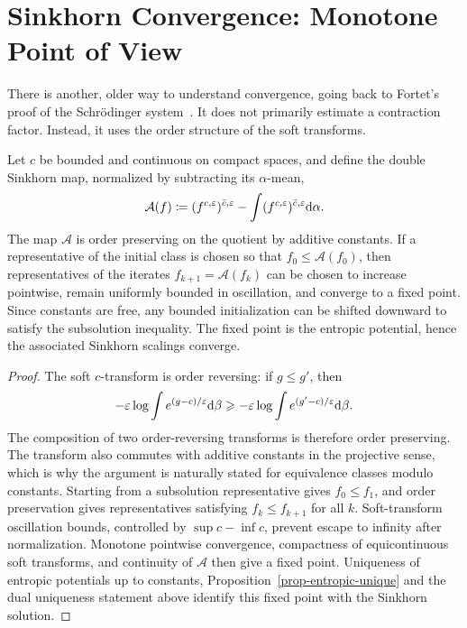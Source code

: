 \section{Sinkhorn Convergence: Monotone Point of View}

There is another, older way to understand convergence, going back to Fortet's proof of the Schr\"odinger system~\cite{fortet1940schrodinger,essid2019fortet,leonard2019fortet}. It does not primarily estimate a contraction factor. Instead, it uses the order structure of the soft transforms.

\begin{prop}\label{prop-fortet-monotone}
	Let $c$ be bounded and continuous on compact spaces, and define the double Sinkhorn map, normalized by subtracting its $\alpha$-mean,
	\[
		\mathcal A(f) \coloneqq
		(f^{c,\varepsilon})^{\bar c,\varepsilon}
		-\int (f^{c,\varepsilon})^{\bar c,\varepsilon}\mathrm{d}\alpha.
	\]
	The map $\mathcal A$ is order preserving on the quotient by additive constants. If a representative of the initial class is chosen so that $f_0\leq \mathcal A(f_0)$, then representatives of the iterates $f_{k+1}=\mathcal A(f_k)$ can be chosen to increase pointwise, remain uniformly bounded in oscillation, and converge to a fixed point. Since constants are free, any bounded initialization can be shifted downward to satisfy the subsolution inequality. The fixed point is the entropic potential, hence the associated Sinkhorn scalings converge.
\end{prop}

\begin{proof}
	The soft $c$-transform is order reversing: if $g\leq g'$, then
	\[
		-\varepsilon\log\int e^{(g-c)/\varepsilon}\mathrm{d}\beta
		\geqslant
		-\varepsilon\log\int e^{(g'-c)/\varepsilon}\mathrm{d}\beta.
	\]
	The composition of two order-reversing transforms is therefore order preserving. The transform also commutes with additive constants in the projective sense, which is why the argument is naturally stated for equivalence classes modulo constants. Starting from a subsolution representative gives $f_0\leq f_1$, and order preservation gives representatives satisfying $f_k\leq f_{k+1}$ for all $k$. Soft-transform oscillation bounds, controlled by $\sup c-\inf c$, prevent escape to infinity after normalization. Monotone pointwise convergence, compactness of equicontinuous soft transforms, and continuity of $\mathcal A$ then give a fixed point. Uniqueness of entropic potentials up to constants, Proposition~\ref{prop-entropic-unique} and the dual uniqueness statement above identify this fixed point with the Sinkhorn solution.
\end{proof}

